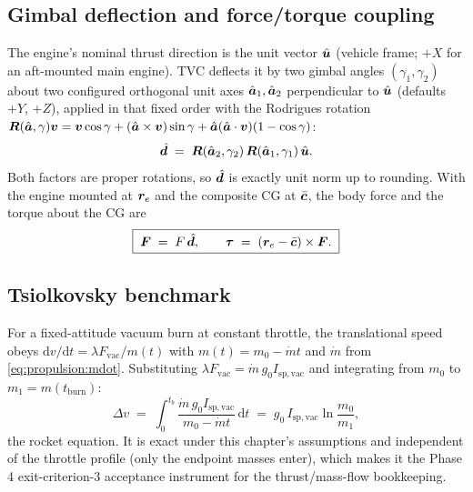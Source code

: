 \subsection{Gimbal deflection and force/torque coupling}

The engine's nominal thrust direction is the unit vector $\hat{\bm{u}}$
(vehicle frame; $+X$ for an aft-mounted main engine). TVC deflects it
by two gimbal angles $(\gamma_1, \gamma_2)$ about two configured
orthogonal unit axes $\hat{\bm{a}}_1, \hat{\bm{a}}_2$ perpendicular to
$\hat{\bm{u}}$ (defaults $+Y$, $+Z$), applied in that fixed order with
the Rodrigues rotation
$\bm{R}(\hat{\bm{a}}, \gamma)\bm{v} = \bm{v}\cos\gamma +
(\hat{\bm{a}} \times \bm{v})\sin\gamma + \hat{\bm{a}}
(\hat{\bm{a}} \cdot \bm{v})(1 - \cos\gamma)$:
\begin{equation}
  \hat{\bm{d}} \;=\; \bm{R}(\hat{\bm{a}}_2, \gamma_2)\,
    \bm{R}(\hat{\bm{a}}_1, \gamma_1)\, \hat{\bm{u}}.
  \label{eq:propulsion:direction}
\end{equation}
Both factors are proper rotations, so $\hat{\bm{d}}$ is exactly unit
norm up to rounding. With the engine mounted at $\bm{r}_e$ and the
composite CG at $\bar{\bm{c}}$, the body force and the torque about the
CG are
\begin{equation}
  \boxed{\; \bm{F} \;=\; F\, \hat{\bm{d}}, \qquad
  \bm{\tau} \;=\; (\bm{r}_e - \bar{\bm{c}}) \times \bm{F}. \;}
  \label{eq:propulsion:forcetorque}
\end{equation}

\subsection{Tsiolkovsky benchmark}

For a fixed-attitude vacuum burn at constant throttle, the
translational speed obeys $\mathrm{d}v/\mathrm{d}t = \lambda
F_{\mathrm{vac}} / m(t)$ with $m(t) = m_0 - \dot{m} t$ and $\dot{m}$
from \eqref{eq:propulsion:mdot}. Substituting
$\lambda F_{\mathrm{vac}} = \dot{m}\, g_0 I_{\mathrm{sp,vac}}$ and
integrating from $m_0$ to $m_1 = m(t_{\mathrm{burn}})$:
\begin{equation}
  \Delta v \;=\; \int_0^{t_b}
    \frac{\dot{m}\, g_0 I_{\mathrm{sp,vac}}}{m_0 - \dot{m} t}\,
    \mathrm{d}t
  \;=\; g_0\, I_{\mathrm{sp,vac}} \ln \frac{m_0}{m_1},
  \label{eq:propulsion:tsiolkovsky}
\end{equation}
the rocket equation. It is exact under this chapter's assumptions and
independent of the throttle profile (only the endpoint masses enter),
which makes it the Phase 4 exit-criterion-3 acceptance instrument for
the thrust/mass-flow bookkeeping.

